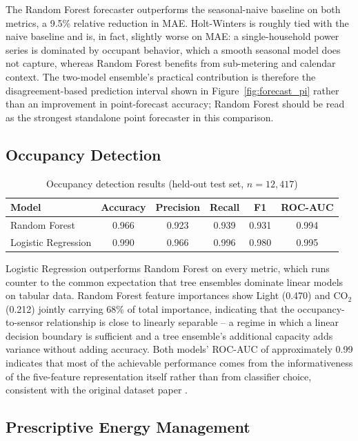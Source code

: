 \documentclass[11pt,a4paper]{article}
\begin{document}
The Random Forest forecaster outperforms the seasonal-naive baseline on both metrics, a 9.5\% relative reduction in MAE. Holt-Winters is roughly tied with the naive baseline and is, in fact, slightly worse on MAE: a single-household power series is dominated by occupant behavior, which a smooth seasonal model does not capture, whereas Random Forest benefits from sub-metering and calendar context. The two-model ensemble's practical contribution is therefore the disagreement-based prediction interval shown in Figure~\ref{fig:forecast_pi} rather than an improvement in point-forecast accuracy; Random Forest should be read as the strongest standalone point forecaster in this comparison.

\subsection{Occupancy Detection}

\begin{table}[htbp]
\centering
\caption{Occupancy detection results (held-out test set, $n=12{,}417$)}
\label{tab:occupancy_results}
\footnotesize
\begin{tabular}{@{}lccccc@{}}
\toprule
\rowcolor{tablehead}
\textbf{Model} & \textbf{Accuracy} & \textbf{Precision} & \textbf{Recall} & \textbf{F1} & \textbf{ROC-AUC} \\
\midrule
Random Forest & 0.966 & 0.923 & 0.939 & 0.931 & 0.994 \\
Logistic Regression & 0.990 & 0.966 & 0.996 & 0.980 & 0.995 \\
\bottomrule
\end{tabular}
\end{table}

Logistic Regression outperforms Random Forest on every metric, which runs counter to the common expectation that tree ensembles dominate linear models on tabular data. Random Forest feature importances show Light (0.470) and CO$_2$ (0.212) jointly carrying 68\% of total importance, indicating that the occupancy-to-sensor relationship is close to linearly separable -- a regime in which a linear decision boundary is sufficient and a tree ensemble's additional capacity adds variance without adding accuracy. Both models' ROC-AUC of approximately 0.99 indicates that most of the achievable performance comes from the informativeness of the five-feature representation itself rather than from classifier choice, consistent with the original dataset paper \citep{candanedo2016}.

\subsection{Prescriptive Energy Management}
\end{document}
